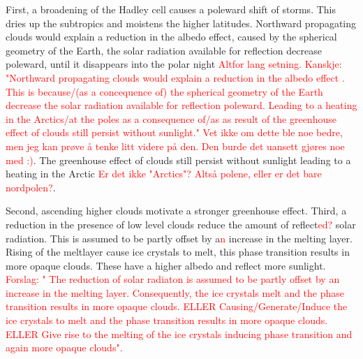 First, a broadening of the Hadley cell causes a poleward shift of storms. This dries up the subtropics and moistens the higher latitudes. Northward propagating clouds would explain a reduction in the albedo effect, caused by the spherical geometry of the Earth, the solar radiation available for reflection decrease poleward, until it disappears into the polar night \textcolor{red}{Altfor lang setning. Kanskje: "Northward propagating clouds would explain a reduction in the albedo effect
. This is because/(as a concequence of)  the spherical geometry of the Earth decrease the solar radiation available for reflection poleward. Leading to a heating in the Arctics/at the poles as a consequence of/as as result of the greenhouse effect of clouds still persist without sunlight." Vet ikke om dette ble noe bedre, men jeg kan prøve å tenke litt videre på den. Den burde det uansett gjøres noe med :)}. 
The greenhouse effect of clouds still persist without sunlight leading to a heating in the Arctic \textcolor{red}{Er det ikke "Arctics"? Altså polene, eller er det bare nordpolen?}.

Second, ascending higher clouds motivate a stronger greenhouse effect. Third, a reduction in the presence of low level clouds reduce the amount of reflect\textcolor{red}{ed?} solar radiation. This is assumed to be partly offset by a\textcolor{red}{n} increase in the melting layer. Rising of the meltlayer cause ice crystals to melt, this phase transition results in more opaque clouds. These have a higher albedo and reflect more sunlight. \textcolor{red}{Forslag: " The reduction of solar radiaton is assumed to be partly offset by an increase in the melting layer. Consequently, the ice crystals melt and the phase transition results in more opaque clouds. ELLER   Causing/Generate/Induce the ice crystals to melt and the phase transition results in more opaque clouds. ELLER Give rise to the melting of the ice crystals inducing phase transition and again more opaque clouds".}
